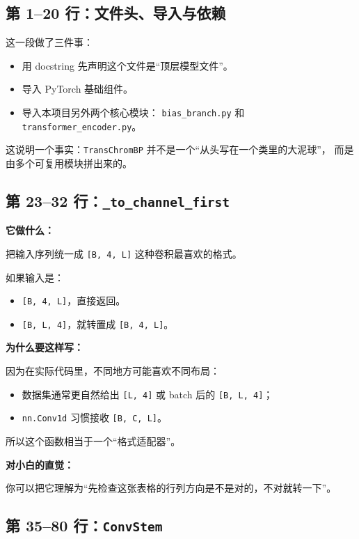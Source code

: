 \documentclass[11pt,a4paper]{ctexart}
\begin{document}
\subsection{第 1--20 行：文件头、导入与依赖}

这一段做了三件事：

\begin{itemize}[leftmargin=2em]
\item 用 docstring 先声明这个文件是“顶层模型文件”。
\item 导入 PyTorch 基础组件。
\item 导入本项目另外两个核心模块：
  \texttt{bias\_branch.py} 和 \texttt{transformer\_encoder.py}。
\end{itemize}

这说明一个事实：\texttt{TransChromBP} 并不是一个“从头写在一个类里的大泥球”，
而是由多个可复用模块拼出来的。

\subsection{第 23--32 行：\texttt{\_to\_channel\_first}}

\textbf{它做什么：}

把输入序列统一成 \texttt{[B, 4, L]} 这种卷积最喜欢的格式。

如果输入是：

\begin{itemize}[leftmargin=2em]
\item \texttt{[B, 4, L]}，直接返回。
\item \texttt{[B, L, 4]}，就转置成 \texttt{[B, 4, L]}。
\end{itemize}

\textbf{为什么要这样写：}

因为在实际代码里，不同地方可能喜欢不同布局：

\begin{itemize}[leftmargin=2em]
\item 数据集通常更自然给出 \texttt{[L, 4]} 或 batch 后的 \texttt{[B, L, 4]}；
\item \texttt{nn.Conv1d} 习惯接收 \texttt{[B, C, L]}。
\end{itemize}

所以这个函数相当于一个“格式适配器”。

\textbf{对小白的直觉：}

你可以把它理解为“先检查这张表格的行列方向是不是对的，不对就转一下”。

\subsection{第 35--80 行：\texttt{ConvStem}}
\end{document}
